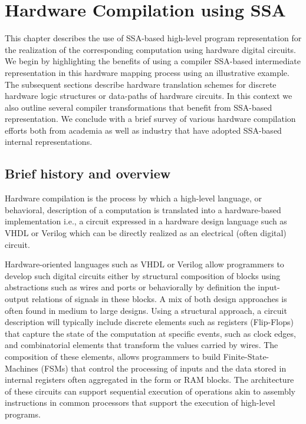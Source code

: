 \chapter{Hardware Compilation using SSA
}
\label{chapter:hardware_compilation}

This chapter describes the use of SSA-based high-level program representation for the realization of the corresponding computation using hardware digital circuits. 
  We begin by highlighting the benefits of using a compiler SSA-based intermediate representation in this hardware mapping process using an illustrative example. 
  The subsequent sections describe hardware translation schemes for discrete hardware logic structures or data-paths of hardware circuits. 
  In this context we also outline several compiler transformations that benefit from  SSA-based representation. 
  We conclude with a brief survey of various hardware compilation efforts both from academia as well as industry that have adopted SSA-based internal representations.


\renewcommand{\comment}[1]{}

\section{Brief history and overview}

Hardware compilation is the process by which a high-level language, or behavioral, description of a computation is translated into a hardware-based implementation i.e., a circuit expressed in a hardware design language such as VHDL or Verilog which can be directly realized as an electrical (often digital) circuit. 

Hardware-oriented languages such as VHDL or Verilog allow programmers to develop such digital circuits either by structural composition of blocks using abstractions such as wires and ports or behaviorally  by definition the input-output relations of signals in these blocks. A mix of both design approaches is often found in medium to large designs. 
Using a structural  approach, a circuit description  will typically include discrete elements such as registers (Flip-Flops) that capture the state of the computation at specific events, such as clock edges, and combinatorial elements that transform the values carried by wires. The composition of these elements, allows programmers to build Finite-State-Machines (FSMs) that control the processing of inputs and the data stored in internal registers often aggregated in the form or RAM blocks. The architecture of these circuits can support sequential execution of operations akin to assembly instructions in common processors that support the execution of high-level programs.

